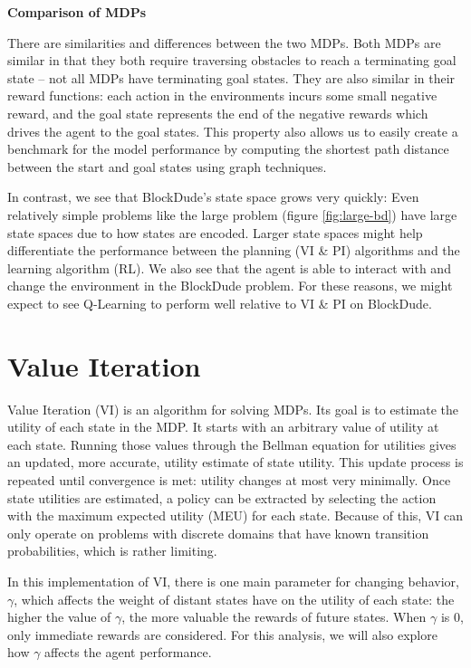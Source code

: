 \documentclass{article}
\begin{document}
\textbf{Comparison of MDPs}

There are similarities and differences between the two MDPs. Both MDPs are similar in that
they both require traversing obstacles to reach a terminating goal state -- not all MDPs
have terminating goal states. They are also similar in their reward functions: each
action in the environments incurs some small negative reward, and the goal state represents
the end of the negative rewards which drives the agent to the goal states. This property
also allows us to easily create a benchmark for the model performance by computing the
shortest path distance between the start and goal states using graph techniques.

In contrast, we see that BlockDude's state space grows very quickly:
Even relatively simple problems like the large problem (figure \ref{fig:large-bd}) have large
state spaces due to how states are encoded. Larger state spaces might help differentiate the
performance between the planning (VI \& PI) algorithms and the learning algorithm (RL). We
also see that the agent is able to interact with and change the environment in the
BlockDude problem. For these reasons, we might expect to see Q-Learning to perform
well relative to VI \& PI on BlockDude.



\section{Value Iteration} \label{VI}

Value Iteration (VI) is an algorithm for solving MDPs. Its goal is to estimate the utility of
each state in the MDP. It starts with an arbitrary value of utility at each state. Running those
values through the Bellman equation for utilities gives an updated, more accurate, utility
estimate of state utility. This update process is repeated until convergence is met: utility
changes at most very minimally. Once state utilities are estimated, a policy can be extracted
by selecting the action with the maximum expected utility (MEU) for each state. Because of this,
VI can only operate on problems with discrete domains that have known transition probabilities,
which is rather limiting.

In this implementation of VI, there is one main parameter for changing behavior, $\gamma$, which
affects the weight of distant states have on the utility of each state: the higher the value of
$\gamma$, the more valuable the rewards of future states. When $\gamma$ is 0, only immediate
rewards are considered. For this analysis, we will also explore how $\gamma$ affects the agent
performance.
\end{document}

